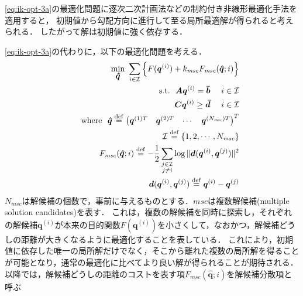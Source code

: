 \eqref{eq:ik-opt-3a}の最適化問題に逐次二次計画法などの制約付き非線形最適化手法を適用すると，
初期値から勾配方向に進行して至る局所最適解が得られると考えられる．
したがって解は初期値に強く依存する．

\eqref{eq:ik-opt-3a}の代わりに，以下の最適化問題を考える．
\begin{eqnarray}
  &&\min_{\mbox{\boldmath{$\hat{q}$}}} \ \sum_{i \in \mathcal{I}} \left\{ F(\mbox{\boldmath{$q$}}^{(i)}) + k_{\mathit{msc}} F_{\mathit{msc}}(\mbox{\boldmath{$\hat{q}$}}; i) \right\} \label{eq:solution-candidate-opt} \\
  &&{\rm s.t.} \ \  \mbox{\boldmath{$A$}} \mbox{\boldmath{$q$}}^{(i)} = \mbox{\boldmath{$\bar{b}$}} \ \ \ \ i \in \mathcal{I} \\
  &&\phantom{\rm s.t.} \ \  \mbox{\boldmath{$C$}} \mbox{\boldmath{$q$}}^{(i)} \geq \mbox{\boldmath{$\bar{d}$}} \ \ \ \ i \in \mathcal{I} \\
  &&{\rm where} \ \ \mbox{\boldmath{$\hat{q}$}} \stackrel{\mathrm{def}}{=} \begin{pmatrix} \mbox{\boldmath{$q$}}^{(1)T} & \mbox{\boldmath{$q$}}^{(2)T} & \cdots & \mbox{\boldmath{$q$}}^{(N_{\mathit{msc}})T} \end{pmatrix}^T \\
  &&\phantom{\rm where} \ \ \mathcal{I} \stackrel{\mathrm{def}}{=} \{ 1,2,\cdots,N_{\mathit{msc}} \} \\
  &&\phantom{\rm where} \ \ F_{\mathit{msc}}(\mbox{\boldmath{$\hat{q}$}}; i) \stackrel{\mathrm{def}}{=} - \frac{1}{2} \sum_{\substack{j \in \mathcal{I} \\ j \not= i}} \log \| \mbox{\boldmath{$d$}}(\mbox{\boldmath{$q$}}^{(i)}, \mbox{\boldmath{$q$}}^{(j)}) \|^2 \\
  &&\phantom{\rm where} \ \ \mbox{\boldmath{$d$}}(\mbox{\boldmath{$q$}}^{(i)}, \mbox{\boldmath{$q$}}^{(j)}) \stackrel{\mathrm{def}}{=} \mbox{\boldmath{$q$}}^{(i)} - \mbox{\boldmath{$q$}}^{(j)}
\end{eqnarray}
$N_{\mathit{msc}}$は解候補の個数で，事前に与えるものとする．$\mathit{msc}$は複数解候補(multiple solution candidates)を表す．
これは，複数の解候補を同時に探索し，それぞれの解候補$\bm{q}^{(i)}$が本来の目的関数$F(\bm{q}^{(i)})$を小さくして，なおかつ，解候補どうしの距離が大きくなるように最適化することを表している．
これにより，初期値に依存した唯一の局所解だけでなく，そこから離れた複数の局所解を得ることが可能となり，通常の最適化に比べてより良い解が得られることが期待される．
以降では，解候補どうしの距離のコストを表す項$F_{\mathit{msc}}(\bm{\hat{q}}; i)$を解候補分散項と呼ぶ
